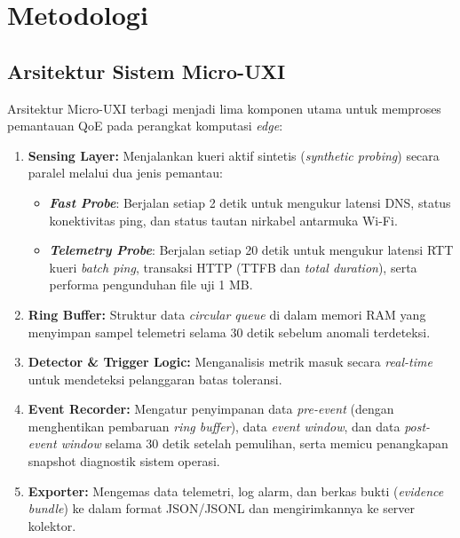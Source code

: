 \section{Metodologi}
\label{sec-metodologi}

\subsection{Arsitektur Sistem Micro-UXI}
Arsitektur Micro-UXI terbagi menjadi lima komponen utama untuk memproses pemantauan QoE pada perangkat komputasi \textit{edge}:
\begin{enumerate}
    \item \textbf{Sensing Layer:} Menjalankan kueri aktif sintetis (\textit{synthetic probing}) secara paralel melalui dua jenis pemantau:
    \begin{itemize}
        \item \textbf{\textit{Fast Probe}}: Berjalan setiap 2 detik untuk mengukur latensi DNS, status konektivitas ping, dan status tautan nirkabel antarmuka Wi-Fi.
        \item \textbf{\textit{Telemetry Probe}}: Berjalan setiap 20 detik untuk mengukur latensi RTT kueri \textit{batch ping}, transaksi HTTP (TTFB dan \textit{total duration}), serta performa pengunduhan file uji 1 MB.
    \end{itemize}
    \item \textbf{Ring Buffer:} Struktur data \textit{circular queue} di dalam memori RAM yang menyimpan sampel telemetri selama 30 detik sebelum anomali terdeteksi.
    \item \textbf{Detector \& Trigger Logic:} Menganalisis metrik masuk secara \textit{real-time} untuk mendeteksi pelanggaran batas toleransi.
    \item \textbf{Event Recorder:} Mengatur penyimpanan data \textit{pre-event} (dengan menghentikan pembaruan \textit{ring buffer}), data \textit{event window}, dan data \textit{post-event window} selama 30 detik setelah pemulihan, serta memicu penangkapan snapshot diagnostik sistem operasi.
    \item \textbf{Exporter:} Mengemas data telemetri, log alarm, dan berkas bukti (\textit{evidence bundle}) ke dalam format JSON/JSONL dan mengirimkannya ke server kolektor.
\end{enumerate}

